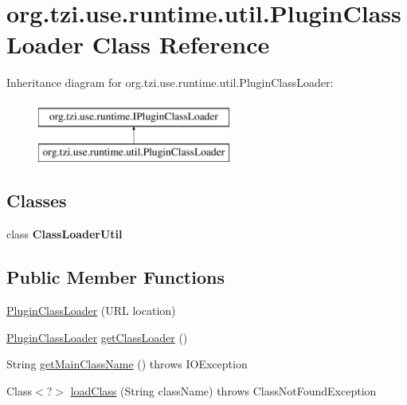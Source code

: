 \hypertarget{classorg_1_1tzi_1_1use_1_1runtime_1_1util_1_1_plugin_class_loader}{\section{org.\-tzi.\-use.\-runtime.\-util.\-Plugin\-Class\-Loader Class Reference}
\label{classorg_1_1tzi_1_1use_1_1runtime_1_1util_1_1_plugin_class_loader}
}
Inheritance diagram for org.\-tzi.\-use.\-runtime.\-util.\-Plugin\-Class\-Loader\-:\begin{figure}[H]
\begin{center}
\leavevmode
\includegraphics[height=2.000000cm]{classorg_1_1tzi_1_1use_1_1runtime_1_1util_1_1_plugin_class_loader}
\end{center}
\end{figure}
\subsection*{Classes}
\begin{DoxyCompactItemize}
\item 
class {\bfseries Class\-Loader\-Util}
\end{DoxyCompactItemize}
\subsection*{Public Member Functions}
\begin{DoxyCompactItemize}
\item 
\hyperlink{classorg_1_1tzi_1_1use_1_1runtime_1_1util_1_1_plugin_class_loader_a46b678003b0fa741abe3be3756c64569}{Plugin\-Class\-Loader} (U\-R\-L location)
\item 
\hyperlink{classorg_1_1tzi_1_1use_1_1runtime_1_1util_1_1_plugin_class_loader}{Plugin\-Class\-Loader} \hyperlink{classorg_1_1tzi_1_1use_1_1runtime_1_1util_1_1_plugin_class_loader_a5cdec1b55effc39e8d66afe7cfa4246b}{get\-Class\-Loader} ()
\item 
String \hyperlink{classorg_1_1tzi_1_1use_1_1runtime_1_1util_1_1_plugin_class_loader_a15fc4f79c524146a4dce4b7bcacbe133}{get\-Main\-Class\-Name} ()  throws I\-O\-Exception 
\item 
Class$<$?$>$ \hyperlink{classorg_1_1tzi_1_1use_1_1runtime_1_1util_1_1_plugin_class_loader_a6243bd9820cfd2fbd1aa3dc81c5abd7a}{load\-Class} (String class\-Name)  throws Class\-Not\-Found\-Exception 
\end{DoxyCompactItemize}


